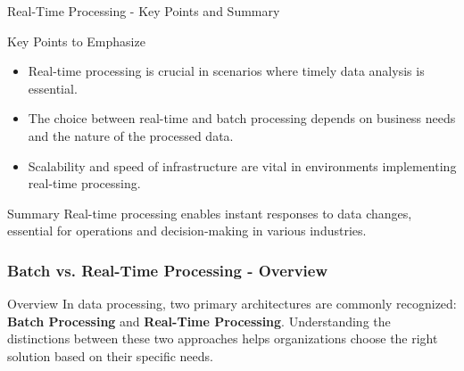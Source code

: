 \documentclass[aspectratio=169]{beamer}
\begin{document}
\begin{frame}[fragile]{Real-Time Processing - Key Points and Summary}
    \begin{block}{Key Points to Emphasize}
        \begin{itemize}
            \item Real-time processing is crucial in scenarios where timely data analysis is essential.
            \item The choice between real-time and batch processing depends on business needs and the nature of the processed data.
            \item Scalability and speed of infrastructure are vital in environments implementing real-time processing.
        \end{itemize}
    \end{block}

    \begin{block}{Summary}
        Real-time processing enables instant responses to data changes, essential for operations and decision-making in various industries.
    \end{block}
\end{frame}

\begin{frame}[fragile]
    \frametitle{Batch vs. Real-Time Processing - Overview}
    \begin{block}{Overview}
        In data processing, two primary architectures are commonly recognized: 
        \textbf{Batch Processing} and \textbf{Real-Time Processing}. 
        Understanding the distinctions between these two approaches helps organizations choose the right solution based on their specific needs.
    \end{block}
\end{frame}
\end{document}
